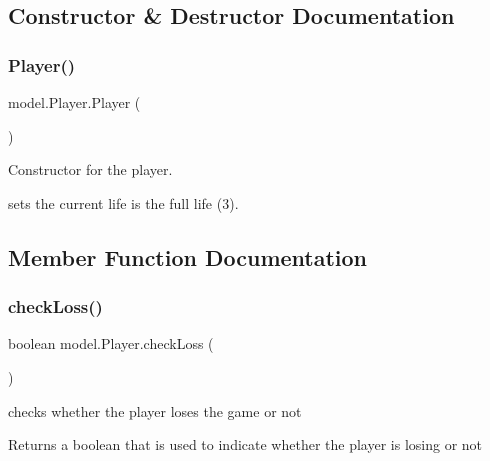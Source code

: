 \subsection{Constructor \& Destructor Documentation}
\hypertarget{classmodel_1_1_player_a6922d8b0b084510c84540a3497504ed3}{}\label{classmodel_1_1_player_a6922d8b0b084510c84540a3497504ed3} 
\subsubsection{\texorpdfstring{Player()}{Player()}}
{\footnotesize\ttfamily model.\+Player.\+Player (\begin{DoxyParamCaption}{ }\end{DoxyParamCaption})}



Constructor for the player. 

sets the current life is the full life (3). 

\subsection{Member Function Documentation}
\hypertarget{classmodel_1_1_player_a1027595469ab5de940ba2f6cbb29e5ef}{}\label{classmodel_1_1_player_a1027595469ab5de940ba2f6cbb29e5ef} 
\subsubsection{\texorpdfstring{check\+Loss()}{checkLoss()}}
{\footnotesize\ttfamily boolean model.\+Player.\+check\+Loss (\begin{DoxyParamCaption}{ }\end{DoxyParamCaption})}



checks whether the player loses the game or not 

\begin{DoxyReturn}{Returns}
a boolean that is used to indicate whether the player is losing or not 
\end{DoxyReturn}
\hypertarget{classmodel_1_1_player_a5551dad23bcab60638b37c8f54dd6796}{}\label{classmodel_1_1_player_a5551dad23bcab60638b37c8f54dd6796} 
